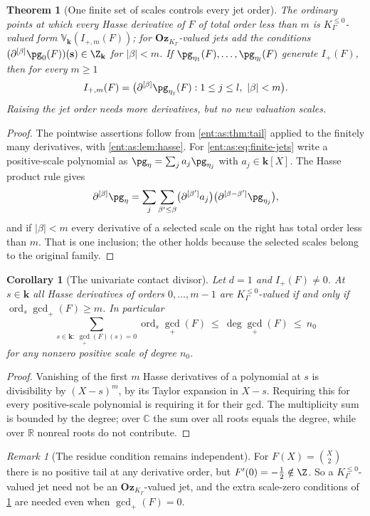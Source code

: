 \documentclass[11pt]{article}
\newtheorem{theorem}{Theorem}[section]
\theoremstyle{plain}
\theoremstyle{plain}
\theoremstyle{plain}
\newtheorem{corollary}[corollary]{Corollary}
\theoremstyle{definition}
\theoremstyle{definition}
\theoremstyle{definition}
\theoremstyle{definition}
\theoremstyle{remark}
\newtheorem{remark}[remark]{Remark}
\newcommand{\C}{\mathbb C}\newcommand{\R}{\mathbb R}
\newcommand{\K}{K_\Gamma}\newcommand{\KD}{K_\Delta}
\DeclareMathOperator{\ord}{ord}\DeclareMathOperator{\cf}{cf}
\newcommand{\kk}{\mathbf k}\newcommand{\PP}{\mathbb P}
\newcommand{\Oz}{\mathbf{Oz}}\newcommand{\Ed}{\mathcal E_{\Gamma,d}}
\newcommand{\Kle}{K_\Gamma^{\le0}}\DeclareMathOperator{\Jac}{Jac}
\newcommand{\Zk}{\Z_{\kk}}\newcommand{\OzK}{\Oz_{\K}}
\begin{document}
\begin{theorem}[One finite set of scales controls every jet order]
\label{ent:as:thm:jets}
The ordinary points at which every Hasse derivative of $F$ of total order less
than $m$ is $\Kle$-valued form $\mathbb V_\kk(I_{+,m}(F))$; for $\OzK$-valued
jets add the conditions $(\partial^{[\beta]}\pg_0(F))(\mathbf s)\in\Zk$ for
$|\beta|<m$. If $\pg_{\eta_1}(F),\ldots,\pg_{\eta_l}(F)$ generate $I_+(F)$, then
for \emph{every} $m\ge1$
\begin{equation}\label{ent:as:eq:finite-jets}
 I_{+,m}(F)=\bigl(\partial^{[\beta]}\pg_{\eta_j}(F):
 1\le j\le l,\ |\beta|<m\bigr).
\end{equation}
Raising the jet order needs more derivatives, but no new valuation scales.
\end{theorem}
\begin{proof}
The pointwise assertions follow from \cref{ent:as:thm:tail} applied to the
finitely many derivatives, with \cref{ent:as:lem:hasse}. For
\eqref{ent:as:eq:finite-jets} write a positive-scale polynomial as
$\pg_\eta=\sum_ja_j\pg_{\eta_j}$ with $a_j\in\kk[X]$. The Hasse product rule
gives
\[
 \partial^{[\beta]}\pg_\eta
 =\sum_j\sum_{\beta'\le\beta}
 \bigl(\partial^{[\beta']}a_j\bigr)\bigl(\partial^{[\beta-\beta']}\pg_{\eta_j}\bigr),
\]
and if $|\beta|<m$ every derivative of a selected scale on the right has total
order less than $m$. That is one inclusion; the other holds because the
selected scales belong to the original family.
\end{proof}

\begin{corollary}[The univariate contact divisor]\label{ent:as:cor:contact}
Let $d=1$ and $I_+(F)\ne0$. At $s\in\kk$ all Hasse derivatives of orders
$0,\ldots,m-1$ are $\Kle$-valued if and only if $\ord_s\gcd_+(F)\ge m$. In
particular
\[
 \sum_{s\in\kk:\ \gcd_+(F)(s)=0}\ord_s\gcd_+(F)\ \le\ \deg\gcd_+(F)\ \le\ n_0
\]
for any nonzero positive scale of degree $n_0$.
\end{corollary}
\begin{proof}
Vanishing of the first $m$ Hasse derivatives of a polynomial at $s$ is
divisibility by $(X-s)^m$, by its Taylor expansion in $X-s$. Requiring this
for every positive-scale polynomial is requiring it for their gcd. The
multiplicity sum is bounded by the degree; over $\C$ the sum over all roots
equals the degree, while over $\R$ nonreal roots do not contribute.
\end{proof}

\begin{remark}[The residue condition remains independent]
\label{ent:as:rem:residue}
For $F(X)=\binom X2$ there is no positive tail at any derivative order, but
$F'(0)=-\tfrac12\notin\Z$. So a $\Kle$-valued jet need not be an $\OzK$-valued
jet, and the extra scale-zero conditions of \cref{ent:as:thm:jets} are needed
even when $\gcd_+(F)=0$.
\end{remark}
\end{document}
